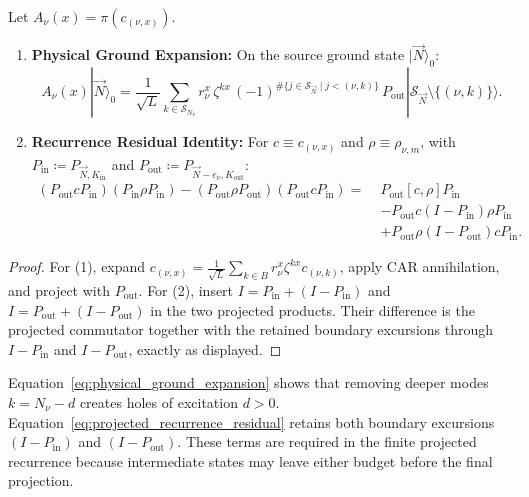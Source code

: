 \begin{lemma}
\label{lem:physical_and_residuals}
Let $A_\nu(x) = \pi(c_{(\nu, x)})$.
\begin{enumerate}
    \item \textbf{Physical Ground Expansion:} On the source ground state $|\vec{N}\rangle_0$:
    \begin{equation}
    \label{eq:physical_ground_expansion}
    A_\nu(x) |\vec{N}\rangle_0 = \frac{1}{\sqrt{L}} \sum_{k \in \mathcal{S}_{N_\nu}} r_\nu^x\, \zeta^{k x}\, (-1)^{\#\{j \in \mathcal{S}_{\vec{N}} \mid j < (\nu, k)\}}\, P_{\mathrm{out}} |\mathcal{S}_{\vec{N}} \setminus \{(\nu, k)\}\rangle.
    \end{equation}
    \item \textbf{Recurrence Residual Identity:} For $c \equiv c_{(\nu, x)}$ and $\rho \equiv \rho_{\nu, m}$, with $P_{\mathrm{in}} \coloneqq P_{\vec{N}, K_{\mathrm{in}}}$ and $P_{\mathrm{out}} \coloneqq P_{\vec{N}-e_\nu, K_{\mathrm{out}}}$:
    \begin{align}
    \label{eq:projected_recurrence_residual}
    (P_{\mathrm{out}} c P_{\mathrm{in}})(P_{\mathrm{in}} \rho P_{\mathrm{in}}) - (P_{\mathrm{out}} \rho P_{\mathrm{out}})(P_{\mathrm{out}} c P_{\mathrm{in}}) = \; &P_{\mathrm{out}} [c, \rho] P_{\mathrm{in}} \\
    &- P_{\mathrm{out}} c (I - P_{\mathrm{in}}) \rho P_{\mathrm{in}} \\
    &+ P_{\mathrm{out}} \rho (I - P_{\mathrm{out}}) c P_{\mathrm{in}}.
    \end{align}
\end{enumerate}
\end{lemma}

\begin{proof}
For (1), expand $c_{(\nu, x)} = \frac{1}{\sqrt{L}} \sum_{k \in B} r_\nu^x \zeta^{kx} c_{(\nu, k)}$, apply CAR annihilation, and project with $P_{\mathrm{out}}$.
For (2), insert $I=P_{\mathrm{in}}+(I-P_{\mathrm{in}})$ and $I=P_{\mathrm{out}}+(I-P_{\mathrm{out}})$ in the two projected products. Their difference is the projected commutator together with the retained boundary excursions through $I-P_{\mathrm{in}}$ and $I-P_{\mathrm{out}}$, exactly as displayed.
\end{proof}

Equation~\eqref{eq:physical_ground_expansion} shows that removing deeper modes $k = N_\nu - d$ creates holes of excitation $d > 0$.
Equation~\eqref{eq:projected_recurrence_residual} retains both boundary
excursions $(I - P_{\mathrm{in}})$ and $(I - P_{\mathrm{out}})$. These
terms are required in the finite projected recurrence because intermediate
states may leave either budget before the final projection.

